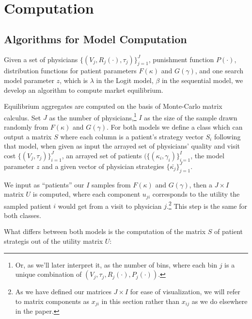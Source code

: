 \documentclass[../main.tex]{subfiles}
\begin{document}
\section{Computation}

\subsection{Algorithms for Model Computation}

Given a set of physicians $\{(V_j, R_j(\cdot), \tau_j)\}_{j =1}^{J}$, punishment function $P(\cdot)$, distribution functions for patient parameters $F(\kappa)$ and $G(\gamma)$, and one search model parameter $z$, which is $\lambda$ in the Logit model, $\beta$ in the sequential model, we develop an algorithm to compute market equilibrium.

Equilibrium aggregates are computed on the basis of Monte-Carlo matrix calculus. Set $J$ as the number of physicians,\footnote{Or, as we'll later interpret it, as the number of bins, where each bin $j$ is a unique combination of $ (V_j, \tau_j, R_j(\cdot),P_j(\cdot))$.} $I$ as the size of the sample drawn randomly from $F(\kappa)$ and $G(\gamma)$. For both models we define a class which can output a matrix $S$ where each column is a patient's strategy vector $S_i$ following that model, when given as input the arrayed set of physicians' quality and visit cost $\{(V_j, \tau_j)\}_{i =1}^{J}$, an arrayed set of patients $(\{(\kappa_i,\gamma_i)\}_{i =1}^{I}$, the model parameter $z$ and a given vector of physician strategies $\{\bar{\kappa_j}\}_{j =1}^{J}$.

We input as ``patients'' our $I$ samples from $F(\kappa)$ and $G(\gamma)$, then a $J \times I$ matrix $U$ is computed, where each component $u_{ji}$ corresponds to the utility the sampled patient $i$ would get from a visit to physician $j$.\footnote{As we have defined our matrices $J \times I$ for ease of visualization, we will refer to matrix components as $x_{ji}$ in this section rather than $x_{ij}$ as we do elsewhere in the paper.} This step is the same for both classes.

What differs between both models is the computation of the matrix $S$ of patient strategis out of the utility matrix $U$:
\end{document}
